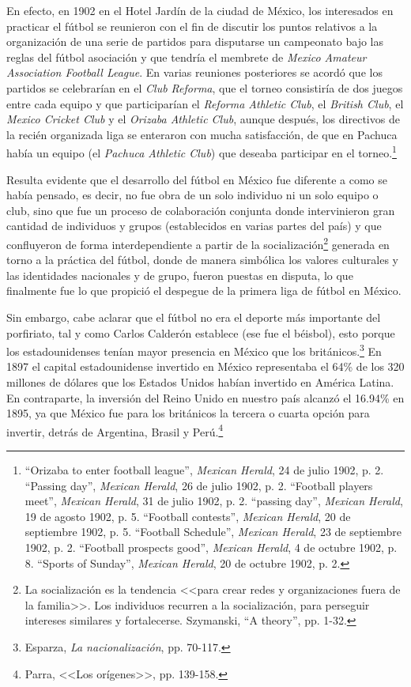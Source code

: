 \documentclass[11pt,a5paper,twoside]{book} %
\begin{document}
En efecto, en 1902 en el Hotel Jardín de la ciudad de México, los interesados en
practicar el fútbol se reunieron con el fin de discutir los puntos relativos a la organización de
una serie de partidos para disputarse un campeonato bajo las reglas del fútbol asociación y
que tendría el membrete de \emph{Mexico Amateur Association Football League}. En varias
reuniones posteriores se acordó que los partidos se celebrarían en el \emph{Club Reforma}, que el
torneo consistiría de dos juegos entre cada equipo y que participarían el \emph{Reforma Athletic
Club}, el \emph{British Club}, el \emph{Mexico Cricket Club} y el \emph{Orizaba Athletic Club}, aunque después,
los directivos de la recién organizada liga se enteraron con mucha satisfacción, de que en
Pachuca había un equipo (el \emph{Pachuca Athletic Club}) que deseaba participar en el torneo.\footnote{``Orizaba to enter football league'', \emph{Mexican Herald}, 24 de julio 1902, p. 2. ``Passing day'', \emph{Mexican Herald}, 26 de julio 1902, p. 2. ``Football players meet'', \emph{Mexican Herald}, 31 de julio 1902, p. 2. ``passing day'', \emph{Mexican Herald}, 19 de agosto 1902, p. 5. ``Football contests'', \emph{Mexican Herald}, 20 de septiembre 1902, p. 5. ``Football Schedule'', \emph{Mexican Herald}, 23 de septiembre 1902, p. 2. ``Football prospects good'', \emph{Mexican Herald}, 4 de octubre 1902, p. 8. ``Sports of Sunday'', \emph{Mexican Herald}, 20 de octubre 1902, p. 2.}

Resulta evidente que el desarrollo del fútbol en México fue diferente a como se había
pensado, es decir, no fue obra de un solo individuo ni un solo equipo o club, sino que fue un
proceso de colaboración conjunta donde intervinieron gran cantidad de individuos y grupos
(establecidos en varias partes del país) y que confluyeron de forma interdependiente a partir de la socialización\footnote{La socialización es la tendencia <<para crear redes y organizaciones fuera de la familia>>. Los individuos
recurren a la socialización, para perseguir intereses similares y fortalecerse. Szymanski, ``A theory'', pp. 1-32.} generada en torno a la práctica del fútbol, donde de manera simbólica los valores culturales y las identidades nacionales y de grupo, fueron puestas en disputa, lo que finalmente fue lo que propició el despegue de la primera liga de fútbol en México.

Sin embargo, cabe aclarar que el fútbol no era el deporte más importante del
porfiriato, tal y como Carlos Calderón establece (ese fue el béisbol), esto porque los
estadounidenses tenían mayor presencia en México que los británicos.\footnote{Esparza, \emph{La nacionalización}, pp. 70-117.} En 1897 el capital
estadounidense invertido en México representaba el 64\% de los 320 millones de dólares que
los Estados Unidos habían invertido en América Latina. En contraparte, la inversión del
Reino Unido en nuestro país alcanzó el 16.94\% en 1895, ya que México fue para los
británicos la tercera o cuarta opción para invertir, detrás de Argentina, Brasil y Perú.\footnote{Parra, <<Los orígenes>>, pp. 139-158.}
\end{document}
